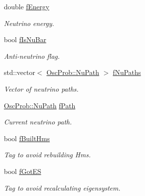 \begin{DoxyCompactItemize}
double \hyperlink{classOscProb_1_1PMNS__Base_a2800af6d436972f3e900867790c046b0}{f\+Energy}
\begin{DoxyCompactList}\small\item\em Neutrino energy. \end{DoxyCompactList}\item 
bool \hyperlink{classOscProb_1_1PMNS__Base_a0ebaeaefab36a3ff381c6293faedfdd6}{f\+Is\+Nu\+Bar}
\begin{DoxyCompactList}\small\item\em Anti-\/neutrino flag. \end{DoxyCompactList}\item 
std\+::vector$<$ \hyperlink{structOscProb_1_1NuPath}{Osc\+Prob\+::\+Nu\+Path} $>$ \hyperlink{classOscProb_1_1PMNS__Base_a69db9d57e12fc7cbe0431bc6c18fac93}{f\+Nu\+Paths}
\begin{DoxyCompactList}\small\item\em Vector of neutrino paths. \end{DoxyCompactList}\item 
\hyperlink{structOscProb_1_1NuPath}{Osc\+Prob\+::\+Nu\+Path} \hyperlink{classOscProb_1_1PMNS__Base_a849437aa8891fe042e86886ce8f81c6e}{f\+Path}
\begin{DoxyCompactList}\small\item\em Current neutrino path. \end{DoxyCompactList}\item 
bool \hyperlink{classOscProb_1_1PMNS__Base_a9ac3cadeac8db1b90f3152f476244780}{f\+Built\+Hms}
\begin{DoxyCompactList}\small\item\em Tag to avoid rebuilding Hms. \end{DoxyCompactList}\item 
bool \hyperlink{classOscProb_1_1PMNS__Base_a6dc5cd010d2d70b2324745b4e53e9839}{f\+Got\+ES}
\begin{DoxyCompactList}\small\item\em Tag to avoid recalculating eigensystem. \end{DoxyCompactList}\end{DoxyCompactItemize}
